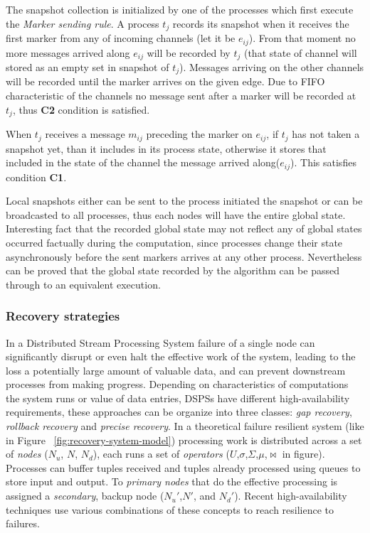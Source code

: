 The snapshot collection is initialized by one of the processes which first execute the \textit{Marker sending rule}. A process $t_j$ records its snapshot when it receives the first marker from any of incoming channels (let it be $e_{ij}$). From that moment no more messages arrived along $e_{ij}$ will be recorded by $t_j$ (that state of channel will stored as an empty set in snapshot of $t_j$). Messages arriving on the other channels will be recorded until the marker arrives on the given edge. Due to FIFO characteristic of the channels no message sent after a marker will be recorded at $t_j$, thus \textbf{C2} condition is satisfied.

When $t_j$ receives a message $m_{ij}$ preceding the marker on $e_{ij}$, if $t_j$ has not taken a snapshot yet, than it includes in its process state, otherwise it stores that included in the state of the channel the message arrived along($e_{ij}$). This satisfies condition \textbf{C1}.

Local snapshots either can be sent to the process initiated the snapshot or can be broadcasted to all processes, thus each nodes will have the entire global state. Interesting fact that the recorded global state may not reflect any of global states occurred factually during the computation, since processes change their state asynchronously before the sent markers arrives at any other process. Nevertheless can be proved that the global state recorded by the algorithm can be passed through to an equivalent execution.\cite{distributedsnapshots}  


\subsubsection{Recovery strategies}
In a Distributed Stream Processing System failure of a single node can significantly disrupt or even halt the effective  work of the system, leading to the loss a potentially large amount of valuable data, and can prevent downstream processes from  making progress. Depending on characteristics of computations the system runs or value of data entries, DSPSs have different high-availability requirements, these approaches can be organize into three classes: \textit{gap recovery}, \textit{rollback recovery} and \textit{precise recovery}. 
In a theoretical failure resilient system (like in Figure ~\ref{fig:recovery-system-model}) processing work is distributed across a set of \textit{nodes} ($N_u$, $N$, $N_d$), each runs a set of \textit{operators} ($U$,$\sigma$,$\Sigma$,$\mu$,$\Join$ in figure). Processes can buffer tuples received and tuples already processed using queues to store input and output. To \textit{primary nodes} that do the effective processing is assigned a \textit{secondary}, backup node ($N_u'$,$N'$, and $N_d'$). Recent high-availability techniques use various combinations of these concepts to reach resilience to failures.

